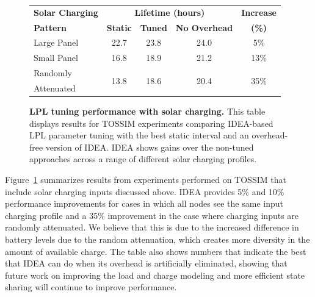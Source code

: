 \begin{figure}[t]
\begin{center}
\begin{tabular}{|l|cccc|}
\hline
\textbf{Solar Charging} & \multicolumn{3}{c}{\textbf{Lifetime (hours)}} &
\textbf{Increase} \\
\textbf{Pattern} & \textbf{Static} & \textbf{Tuned} & \textbf{No Overhead} & \textbf{(\%)} \\ \hline
Large Panel & 22.7 & 23.8 & 24.0 & 5\% \\
Small Panel & 16.8 & 18.9 & 21.2 & 13\% \\
Randomly & \multirow{2}{*}{13.8} & \multirow{2}{*}{18.6} & \multirow{2}{*}{20.4} & \multirow{2}{*}{35\%} \\
Attenuated & & & & \\ \hline
\end{tabular}
\end{center}

\caption{\textbf{LPL tuning performance with solar charging.} This table
displays results for TOSSIM experiments comparing IDEA-based LPL parameter
tuning with the best static interval and an overhead-free version of IDEA.
IDEA shows gains over the non-tuned approaches across a range of different
solar charging profiles.}

\label{idea-table-lplvoptimaltossim}
\end{figure}

Figure~\ref{idea-table-lplvoptimaltossim} summarizes results from experiments
performed on TOSSIM that include solar charging inputs discussed above. IDEA
provides 5\% and 10\% performance improvements for cases in which all nodes
see the same input charging profile and a 35\% improvement in the case where
charging inputs are randomly attenuated. We believe that this is due to the
increased difference in battery levels due to the random attenuation, which
creates more diversity in the amount of available charge. The table also
shows numbers that indicate the best that IDEA can do when its overhead is
artificially eliminated, showing that future work on improving the load and
charge modeling and more efficient state sharing will continue to improve
performance.

